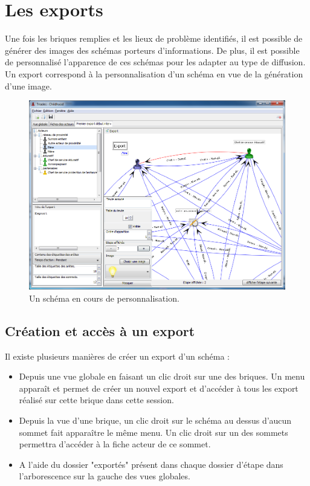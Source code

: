 \chapter{Les exports}
\label{export}

Une fois les briques remplies et les lieux de problème identifiés, il est possible de générer des images des schémas porteurs d'informations. De plus, il est possible de personnalisé l'apparence de ces schémas pour les adapter au type de diffusion.\\

Un export correspond à la personnalisation d'un schéma en vue de la génération d'une image.\\


\begin{figure}[h!t]
\centering
\includegraphics[scale=0.45]{images/vue_export.png}

\caption{Un schéma en cours de personnalisation.}

\end{figure}


\section{Création et accès à un export}

Il existe plusieurs manières de créer un export d'un schéma :\\
\begin{itemize}
\item Depuis une vue globale en faisant un clic droit sur une des briques. Un menu apparaît et permet de créer un nouvel export et d'accéder à tous les export réalisé sur cette brique dans cette session.\\
\item Depuis la vue d'une brique, un clic droit sur le schéma au dessus d'aucun sommet fait apparaître le même menu. Un clic droit sur un des sommets permettra d'accéder à la fiche acteur de ce sommet.\\
\item A l'aide du dossier "exportés" présent dans chaque dossier d'étape dans l'arborescence sur la gauche des vues globales.\\
\end{itemize}
 
